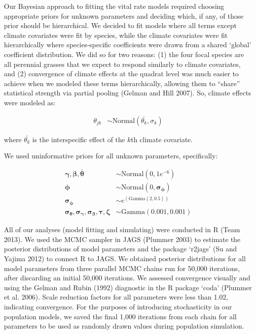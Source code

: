 \documentclass[12pt,]{article}
\begin{document}
Our Bayesian approach to fitting the vital rate models required choosing
appropriate priors for unknown parameters and deciding which, if any, of
those prior should be hierarchical. We decided to fit models where all
terms except climate covariates were fit by species, while the climate
covariates were fit hierarchically where species-specific coefficients
were drawn from a shared `global' coefficient distribution. We did so
for two reasons: (1) the four focal species are all perennial grasses
that we expect to respond similarly to climate covariates, and (2)
convergence of climate effects at the quadrat level was much easier to
achieve when we modeled these terms hierarchically, allowing them to
``share'' statistical strength via partial pooling (Gelman and Hill
2007). So, climate effects were modeled as:

\begin{align}
\theta_{jk} &\sim \text{Normal}(\bar{\theta_{k}}, \sigma_{k})
\end{align}

where $\bar{\theta_{k}}$ is the interspecific effect of the $k$th
climate covariate.

We used uninformative priors for all unknown parameters, specifically:

\begin{align}
\boldsymbol{\gamma, \beta, \bar{\theta}} &\sim \text{Normal}(0, 1e^{-6}) \\
\boldsymbol{\phi} &\sim \text{Normal}(0, \boldsymbol{\sigma_{\phi}}) \\
\boldsymbol{\sigma_{\phi}} &\sim e^{(\text{Gamma}(2, 0.5))} \\
\boldsymbol{\sigma_{\theta}, \sigma_{\gamma}, \sigma_{\beta}, \tau, \zeta} &\sim \text{Gamma}(0.001, 0.001)
\end{align}

All of our analyses (model fitting and simulating) were conducted in R
(Team 2013). We used the MCMC sampler in JAGS (Plummer 2003) to estimate
the posterior distributions of model parameters and the package `r2jags'
(Su and Yajima 2012) to connect R to JAGS. We obtained posterior
distributions for all model parameters from three parallel MCMC chains
run for 50,000 iterations, after discarding an initial 50,000
iterations. We assessed convergence visually and using the Gelman and
Rubin (1992) diagnostic in the R package `coda' (Plummer et al. 2006).
Scale reduction factors for all parameters were less than 1.02,
indicating convergence. For the purposes of introducing stochasticity in
our population models, we saved the final 1,000 iterations from each
chain for all parameters to be used as randomly drawn values during
population simulation.
\end{document}

